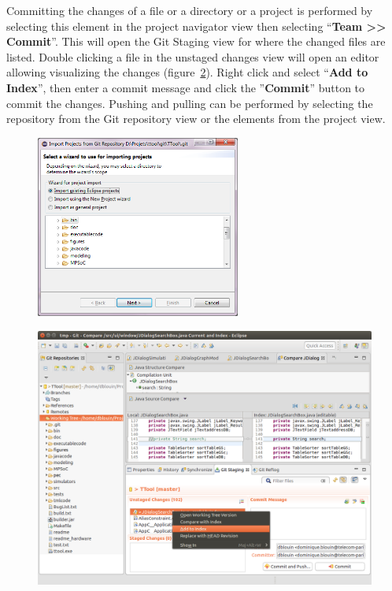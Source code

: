\documentclass[12pt]{article}
\begin{document}
Committing the changes of a file or a directory or a project is performed by
selecting this element in the project navigator view then selecting
``\textbf{Team >> Commit}''. This will open the Git Staging view for where the changed
files are listed. Double clicking a file in the unstaged changes view will open
an editor allowing visualizing the changes (figure~\ref{fig:image7}). Right click and select
``\textbf{Add to Index}'', then enter a commit message and click the ''\textbf{Commit}'' button to
commit the changes. Pushing and pulling can be performed by selecting the repository from
the Git repository view or the elements from the project view.

\begin{figure}[H]
\begin{center}
\includegraphics[width=0.6\textwidth]{images/image7.png}
\end{center}
\caption{}
\label{fig:image6}
\end{figure}

\begin{figure}[H]
\begin{center}
\includegraphics[width=\textwidth]{images/image8.png}
\end{center}
\caption{}
\label{fig:image7}
\end{figure}
\end{document}
